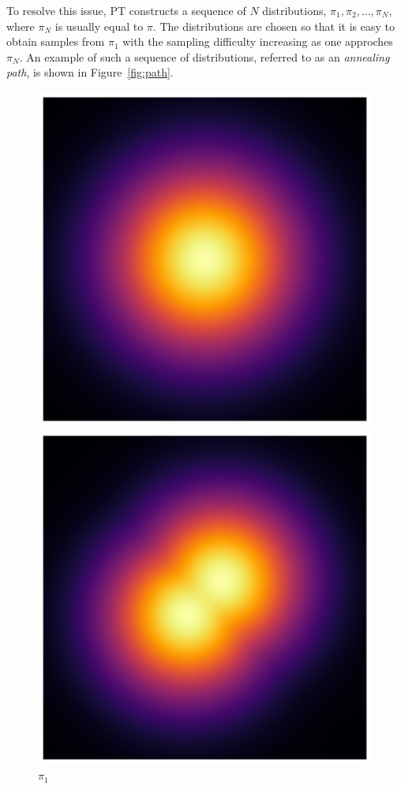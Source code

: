 To resolve this issue, PT constructs a sequence of $N$ distributions,  
$\pi_1, \pi_2, \ldots, \pi_N$, where $\pi_N$ is usually equal to $\pi$.
The distributions are chosen so that it is easy to obtain samples from $\pi_1$
with the sampling difficulty increasing as one approches $\pi_N$. An example 
of such a sequence of distributions, referred to as an \textit{annealing path},
is shown in Figure~\ref{fig:path}.

\begin{figure}[t]
    \centering
    \begin{minipage}{0.15\textwidth}
      \centering
      \includegraphics[width=\textwidth]{../img/heatmap_path_1.pdf}
      \caption*{$\pi_1$}
    \end{minipage}
    \begin{minipage}{0.15\textwidth}
      \centering
      \includegraphics[width=\textwidth]{../img/heatmap_path_2.pdf}

\end{minipage}
\end{figure}
